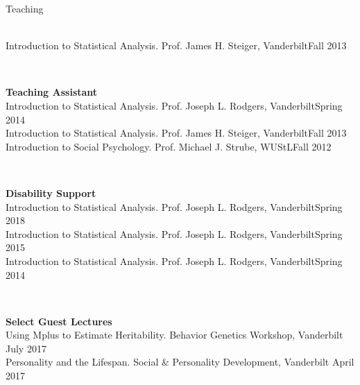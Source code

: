 \begin{rSection}{\textrm{Teaching}}
\begin{minipage}{\linewidth}
\smallskip\\
Introduction to Statistical Analysis. Prof. James H. Steiger, Vanderbilt\hfill{Fall 2013}%
\end{minipage}
\medskip\\
\begin{minipage}{\linewidth}{\large {\bf Teaching Assistant}}\\
Introduction to Statistical Analysis. Prof. Joseph L. Rodgers, Vanderbilt\hfill  {Spring 2014}\smallskip\\
Introduction to Statistical Analysis. Prof. James H. Steiger, Vanderbilt\hfill  {Fall 2013}\smallskip\\
Introduction to Social Psychology. Prof. Michael J. Strube, WUStL\hfill{Fall 2012}\end{minipage}\medskip\\
\begin{minipage}{\linewidth}{\large {\bf Disability Support}}\\
Introduction to Statistical Analysis. Prof. Joseph L. Rodgers, Vanderbilt\hfill{Spring 2018}\smallskip\\
Introduction to Statistical Analysis. Prof. Joseph L. Rodgers, Vanderbilt\hfill{Spring 2015}\smallskip\\
Introduction to Statistical Analysis. Prof. Joseph L. Rodgers, Vanderbilt\hfill{Spring 2014}\end{minipage}\medskip\\
\begin{minipage}{\linewidth}{\large {\bf Select Guest Lectures}}\\
Using Mplus to Estimate Heritability. Behavior Genetics Workshop, Vanderbilt \hfill{July 2017}\\
Personality and the Lifespan. Social \& Personality Development, Vanderbilt \hfill{April 2017}\end{minipage}
\end{rSection}
